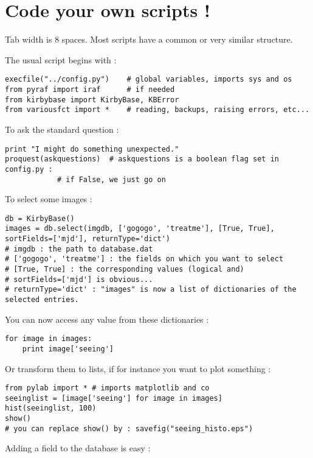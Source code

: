 

\section{Code your own scripts !}

Tab width is 8 spaces. Most scripts have a common or very similar structure.

The usual script begins with :

\begin{lstlisting}
execfile("../config.py")	# global variables, imports sys and os
from pyraf import iraf		# if needed
from kirbybase import KirbyBase, KBError
from variousfct import *	# reading, backups, raising errors, etc...
\end{lstlisting}

To ask the standard question :

\begin{lstlisting}
print "I might do something unexpected."
proquest(askquestions)	# askquestions is a boolean flag set in config.py :
			# if False, we just go on
\end{lstlisting}


To select some images :

\begin{lstlisting}
db = KirbyBase()
images = db.select(imgdb, ['gogogo', 'treatme'], [True, True], sortFields=['mjd'], returnType='dict')
# imgdb : the path to database.dat
# ['gogogo', 'treatme'] : the fields on which you want to select
# [True, True] : the corresponding values (logical and)
# sortFields=['mjd'] is obvious...
# returnType='dict' : "images" is now a list of dictionaries of the selected entries.
\end{lstlisting}

You can now access any value from these dictionaries :

\begin{lstlisting}
for image in images:
	print image['seeing']
\end{lstlisting}

Or transform them to lists, if for instance you want to plot something :

\begin{lstlisting}
from pylab import *	# imports matplotlib and co
seeinglist = [image['seeing'] for image in images]
hist(seeinglist, 100)
show()
# you can replace show() by : savefig("seeing_histo.eps")
\end{lstlisting}

Adding a field to the database is easy :

